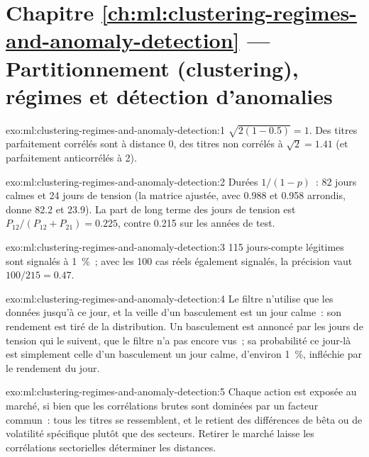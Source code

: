 \section*{Chapitre \ref{ch:ml:clustering-regimes-and-anomaly-detection} --- Partitionnement (clustering), régimes et détection d'anomalies}

\begin{solution}{exo:ml:clustering-regimes-and-anomaly-detection:1}
$\sqrt{2(1 - 0.5)} = 1$. Des titres parfaitement corrélés sont à distance 0, des titres non corrélés à $\sqrt2 = 1.41$ (et parfaitement
anticorrélés à 2).
\end{solution}

\begin{solution}{exo:ml:clustering-regimes-and-anomaly-detection:2}
Durées $1/(1 - p)$~: 82 jours calmes et 24 jours de tension (la matrice ajustée, avec 0.988 et 0.958 arrondis, donne 82.2 et 23.9). La
part de long terme des jours de tension est $P_{12}/(P_{12} + P_{21}) = 0.225$, contre 0.215 sur les années de test.
\end{solution}

\begin{solution}{exo:ml:clustering-regimes-and-anomaly-detection:3}
115 jours-compte légitimes sont signalés à 1~\%~; avec les 100 cas réels également signalés, la précision vaut $100/215 = 0.47$.
\end{solution}

\begin{solution}{exo:ml:clustering-regimes-and-anomaly-detection:4}
Le filtre n'utilise que les données jusqu'à ce jour, et la veille d'un basculement est un jour calme~: son rendement est tiré de la
distribution. Un basculement est annoncé par les jours de tension qui le suivent, que le filtre n'a pas encore vus~; sa probabilité
ce jour-là est simplement celle d'un basculement un jour calme, d'environ 1~\%, infléchie par le rendement du jour.
\end{solution}

\begin{solution}{exo:ml:clustering-regimes-and-anomaly-detection:5}
Chaque action est exposée au marché, si bien que les corrélations brutes sont dominées par un facteur commun~: tous les titres se ressemblent, et le
 retient des différences de bêta ou de volatilité spécifique plutôt que des secteurs. Retirer le marché laisse les
corrélations sectorielles déterminer les distances.
\end{solution}

